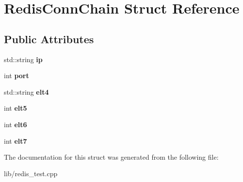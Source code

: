 \hypertarget{structRedisConnChain}{\section{Redis\-Conn\-Chain Struct Reference}
\label{structRedisConnChain}
}
\subsection*{Public Attributes}
\begin{DoxyCompactItemize}
\item 
\hypertarget{structRedisConnChain_a4694dc63aa9ea1864ddd3bd32324a517}{std\-::string {\bfseries ip}}\label{structRedisConnChain_a4694dc63aa9ea1864ddd3bd32324a517}

\item 
\hypertarget{structRedisConnChain_a5cc9c60a354a6519ab6738a97a30acf9}{int {\bfseries port}}\label{structRedisConnChain_a5cc9c60a354a6519ab6738a97a30acf9}

\item 
\hypertarget{structRedisConnChain_a99e8c8ca0541b51116ec27fc6632936f}{std\-::string {\bfseries elt4}}\label{structRedisConnChain_a99e8c8ca0541b51116ec27fc6632936f}

\item 
\hypertarget{structRedisConnChain_a1442b0ea583a2c13f3b41ed2e0a3d98a}{int {\bfseries elt5}}\label{structRedisConnChain_a1442b0ea583a2c13f3b41ed2e0a3d98a}

\item 
\hypertarget{structRedisConnChain_a016427842238022ff9d4d73975fb8140}{int {\bfseries elt6}}\label{structRedisConnChain_a016427842238022ff9d4d73975fb8140}

\item 
\hypertarget{structRedisConnChain_ad6624fa9fbae3786931615f2bb3e83a0}{int {\bfseries elt7}}\label{structRedisConnChain_ad6624fa9fbae3786931615f2bb3e83a0}

\end{DoxyCompactItemize}


The documentation for this struct was generated from the following file\-:\begin{DoxyCompactItemize}
\item 
lib/redis\-\_\-test.\-cpp\end{DoxyCompactItemize}
